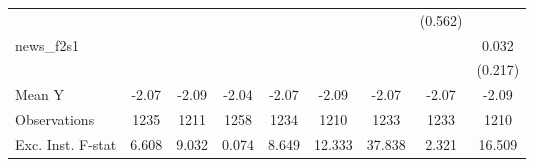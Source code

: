 {\begin{tabular}{l*{8}{c}}
            &                     &                     &                     &                     &                     &                     &     (0.562)         &                     \\
\addlinespace
news\_f2s1   &                     &                     &                     &                     &                     &                     &                     &       0.032         \\
            &                     &                     &                     &                     &                     &                     &                     &     (0.217)         \\
\midrule
Mean Y      &       -2.07         &       -2.09         &       -2.04         &       -2.07         &       -2.09         &       -2.07         &       -2.07         &       -2.09         \\
Observations&        1235         &        1211         &        1258         &        1234         &        1210         &        1233         &        1233         &        1210         \\
Exc. Inst. F-stat&       6.608         &       9.032         &       0.074         &       8.649         &      12.333         &      37.838         &       2.321         &      16.509         \\
\bottomrule
\end{tabular}
}
